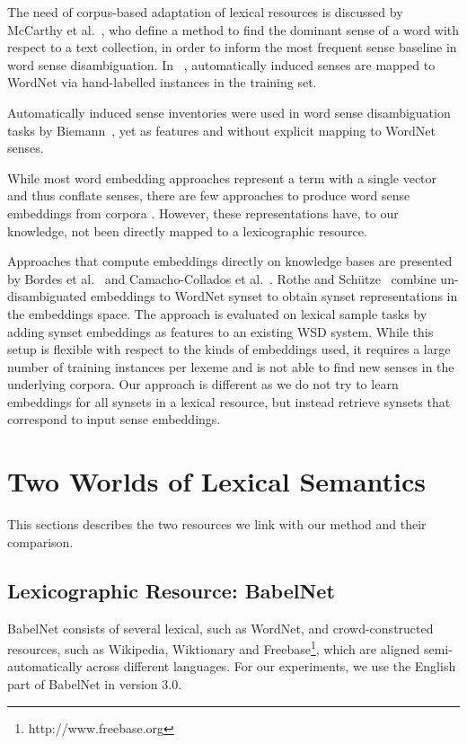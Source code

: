 \documentclass[10pt, a4paper]{article}
\begin{document}
The need of corpus-based adaptation of lexical resources is discussed by McCarthy et al.~, who define a method to find the dominant sense of a word with respect to a text collection, in order to inform the most frequent sense baseline in word sense disambiguation. In ~\cite{agirreEtAl2006}, automatically induced senses are mapped to WordNet via hand-labelled instances in the training set. 

Automatically induced sense inventories were used in word sense disambiguation tasks by Biemann~, yet as features and without explicit mapping to WordNet senses. 

While most word embedding approaches represent a term with a single vector and thus conflate senses, there are few approaches to produce word sense embeddings from corpora \cite{Huang2012,tianEtAl2014,neelakantanefficient,bartunov2015breaking,li2015multi}. However, these representations have, to our knowledge, not been directly mapped to a lexicographic resource. 

 Approaches that compute embeddings directly on knowledge bases are presented by Bordes et al.~ and Camacho-Collados et al.~. Rothe and Sch\"utze~ combine un-disambiguated embeddings to  WordNet synset to obtain synset representations in the embeddings space. The approach is evaluated on lexical sample tasks by adding synset embeddings as features to an existing WSD system. While this setup is flexible with respect to the kinds of embeddings used, it requires a large number of training instances per lexeme and is not able to find new senses in the underlying corpora. Our approach is different as we do not try to learn embeddings for all synsets in a lexical resource, but instead retrieve synsets that correspond to input sense embeddings. 

\section{Two Worlds of Lexical Semantics}

This sections describes the two resources we link with our method and their comparison.

\subsection{Lexicographic Resource: BabelNet}
BabelNet consists of several lexical, such as WordNet, and crowd-constructed resources, such as Wikipedia, Wiktionary and Freebase\footnote{http://www.freebase.org}, which are aligned semi-automatically across different languages. For our experiments, we use the English part of BabelNet in version 3.0.
\end{document}
